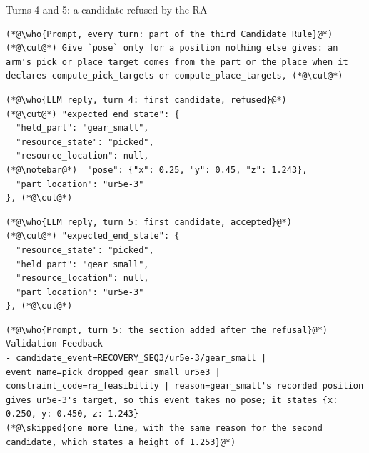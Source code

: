 \documentclass[preprint,12pt,authoryear]{elsarticle}
\newcommand{\vd}{\raisebox{-0.1ex}{\vbox{\baselineskip 3pt\lineskip 0pt\lineskiplimit 0pt\hbox{.}\hbox{.}\hbox{.}}}}
\newcommand{\skipped}[1]{{\normalfont\itshape\fontsize{9}{11}\selectfont\color{cutgray}\vd\enspace #1}}
\newcommand{\who}[1]{{\normalfont\bfseries\fontsize{9}{11}\selectfont\rule{0pt}{2.6ex}#1}}
\begin{document}
\begin{table}[!htb]
\begin{recbox}{Turns 4 and 5: a candidate refused by the RA}
\begin{lstlisting}
(*@\who{Prompt, every turn: part of the third Candidate Rule}@*)
(*@\cut@*) Give `pose` only for a position nothing else gives: an arm's pick or place target comes from the part or the place when it declares compute_pick_targets or compute_place_targets, (*@\cut@*)
\end{lstlisting}

\vspace{3pt}
\begin{minipage}[t]{0.485\linewidth}
\begin{lstlisting}
(*@\who{LLM reply, turn 4: first candidate, refused}@*)
(*@\cut@*) "expected_end_state": {
  "held_part": "gear_small",
  "resource_state": "picked",
  "resource_location": null,
(*@\notebar@*)  "pose": {"x": 0.25, "y": 0.45, "z": 1.243},
  "part_location": "ur5e-3"
}, (*@\cut@*)
\end{lstlisting}
\end{minipage}\hfill
\begin{minipage}[t]{0.485\linewidth}
\begin{lstlisting}
(*@\who{LLM reply, turn 5: first candidate, accepted}@*)
(*@\cut@*) "expected_end_state": {
  "resource_state": "picked",
  "held_part": "gear_small",
  "resource_location": null,
  "part_location": "ur5e-3"
}, (*@\cut@*)
\end{lstlisting}
\end{minipage}

\vspace{3pt}
\begin{lstlisting}
(*@\who{Prompt, turn 5: the section added after the refusal}@*)
Validation Feedback
- candidate_event=RECOVERY_SEQ3/ur5e-3/gear_small | event_name=pick_dropped_gear_small_ur5e3 | constraint_code=ra_feasibility | reason=gear_small's recorded position gives ur5e-3's target, so this event takes no pose; it states {x: 0.250, y: 0.450, z: 1.243}
(*@\skipped{one more line, with the same reason for the second candidate, which states a height of 1.253}@*)
\end{lstlisting}
\end{recbox}
\caption{A feasibility refusal: the rule, the end state before and after, and the feedback between them. The red bar marks the stated pose (\texttt{outline.md}, turns 4 and 5).}\label{tab:ra}
\end{table}
\end{document}
